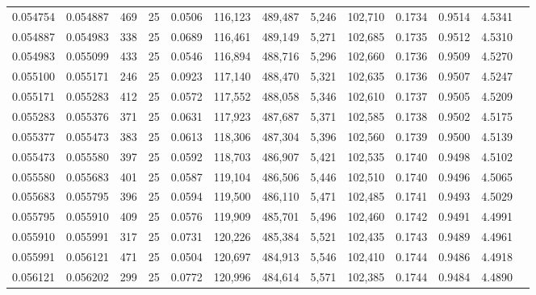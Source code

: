 \begin{tabular}{rrrrrrrrrrrrr}
0.054754 & 0.054887 &   469 &  25 &                                     0.0506 & 116,123 & 489,487 &   5,246 & 102,710 & 0.1734 & 0.9514 & 4.5341 \\
0.054887 & 0.054983 &   338 &  25 &                                     0.0689 & 116,461 & 489,149 &   5,271 & 102,685 & 0.1735 & 0.9512 & 4.5310 \\
0.054983 & 0.055099 &   433 &  25 &                                     0.0546 & 116,894 & 488,716 &   5,296 & 102,660 & 0.1736 & 0.9509 & 4.5270 \\
0.055100 & 0.055171 &   246 &  25 &                                     0.0923 & 117,140 & 488,470 &   5,321 & 102,635 & 0.1736 & 0.9507 & 4.5247 \\
0.055171 & 0.055283 &   412 &  25 &                                     0.0572 & 117,552 & 488,058 &   5,346 & 102,610 & 0.1737 & 0.9505 & 4.5209 \\
0.055283 & 0.055376 &   371 &  25 &                                     0.0631 & 117,923 & 487,687 &   5,371 & 102,585 & 0.1738 & 0.9502 & 4.5175 \\
0.055377 & 0.055473 &   383 &  25 &                                     0.0613 & 118,306 & 487,304 &   5,396 & 102,560 & 0.1739 & 0.9500 & 4.5139 \\
0.055473 & 0.055580 &   397 &  25 &                                     0.0592 & 118,703 & 486,907 &   5,421 & 102,535 & 0.1740 & 0.9498 & 4.5102 \\
0.055580 & 0.055683 &   401 &  25 &                                     0.0587 & 119,104 & 486,506 &   5,446 & 102,510 & 0.1740 & 0.9496 & 4.5065 \\
0.055683 & 0.055795 &   396 &  25 &                                     0.0594 & 119,500 & 486,110 &   5,471 & 102,485 & 0.1741 & 0.9493 & 4.5029 \\
0.055795 & 0.055910 &   409 &  25 &                                     0.0576 & 119,909 & 485,701 &   5,496 & 102,460 & 0.1742 & 0.9491 & 4.4991 \\
0.055910 & 0.055991 &   317 &  25 &                                     0.0731 & 120,226 & 485,384 &   5,521 & 102,435 & 0.1743 & 0.9489 & 4.4961 \\
0.055991 & 0.056121 &   471 &  25 &                                     0.0504 & 120,697 & 484,913 &   5,546 & 102,410 & 0.1744 & 0.9486 & 4.4918 \\
0.056121 & 0.056202 &   299 &  25 &                                     0.0772 & 120,996 & 484,614 &   5,571 & 102,385 & 0.1744 & 0.9484 & 4.4890 \\

\end{tabular}
